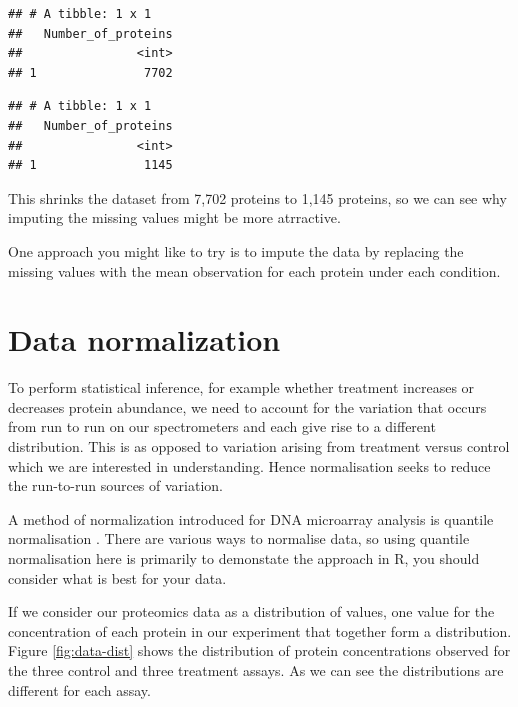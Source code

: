 \documentclass[12pt,]{book}
\newenvironment{Shaded}{\begin{snugshade}}{\end{snugshade}}
\newcommand{\CommentTok}[1]{\textcolor[rgb]{0.56,0.35,0.01}{\textit{#1}}}
\newcommand{\DataTypeTok}[1]{\textcolor[rgb]{0.13,0.29,0.53}{#1}}
\newcommand{\KeywordTok}[1]{\textcolor[rgb]{0.13,0.29,0.53}{\textbf{#1}}}
\newcommand{\NormalTok}[1]{#1}
\newcommand{\OperatorTok}[1]{\textcolor[rgb]{0.81,0.36,0.00}{\textbf{#1}}}
\newcommand{\StringTok}[1]{\textcolor[rgb]{0.31,0.60,0.02}{#1}}
\begin{document}
\begin{verbatim}
## # A tibble: 1 x 1
##   Number_of_proteins
##                <int>
## 1               7702
\end{verbatim}

\begin{Shaded}
\end{Shaded}

\begin{verbatim}
## # A tibble: 1 x 1
##   Number_of_proteins
##                <int>
## 1               1145
\end{verbatim}

This shrinks the dataset from 7,702 proteins to 1,145 proteins, so we can see
why imputing the missing values might be more atrractive.

One approach you might like to try is to impute the data by replacing the
missing values with the mean observation for each protein under each condition.

\hypertarget{normalisation}{%
\section{Data normalization}\label{normalisation}}

To perform statistical inference, for example whether treatment increases or
decreases protein abundance, we need to account for the variation that occurs
from run to run on our spectrometers and each give rise to a different
distribution. This is as opposed to variation arising from treatment versus
control which we are interested in understanding. Hence normalisation seeks to
reduce the run-to-run sources of variation.

A method of normalization introduced for DNA microarray analysis is
quantile normalisation \citep{bolstad2003}. There are various ways to normalise data,
so using quantile normalisation here is primarily to demonstate the approach in
R, you should consider what is best for your data.

If we consider our proteomics data as a distribution of values, one value for
the concentration of each protein in our experiment that together form a
distribution. Figure \ref{fig:data-dist} shows the distribution of
protein concentrations observed for the three control and three treatment assays.
As we can see the distributions are different for each assay.
\end{document}
